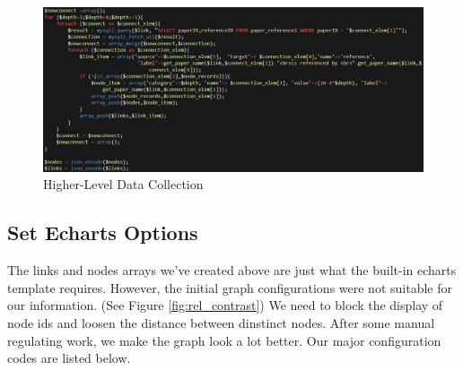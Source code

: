 \documentclass{book}
\begin{document}
\begin{figure}[H]
\centering
\includegraphics[scale=0.55]{img/zlt_rel_code_lev2.png}
\caption{Higher-Level Data Collection}
\end{figure}


\subsection{Set Echarts Options}

The links and nodes arrays we've created above are just what the built-in echarts template requires. However, the initial graph configurations were not suitable for our information. (See Figure \ref{fig:rel_contrast}) We need to block the display of node ids and loosen the distance between dinstinct nodes. After some manual regulating work, we make the graph look a lot better. Our major configuration codes are listed below.
\end{document}
